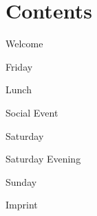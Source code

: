 \section*{Contents}

\noindent Welcome \hfill \pageref{welcome}

\noindent Friday \hfill \pageref{friday}

\noindent Lunch \hfill \pageref{lunch}

\noindent Social Event \hfill \pageref{social-event}

\noindent Saturday \hfill \pageref{saturday}

\noindent Saturday Evening \hfill \pageref{kuehler-krug}

\noindent Sunday \hfill \pageref{sunday}

\noindent Imprint \hfill \pageref{imprint}\\
